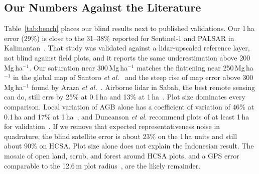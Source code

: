 \documentclass[conference,a4paper]{IEEEtran}
\begin{document}
\subsection{Our Numbers Against the Literature}
Table~\ref{tab:bench} places our blind results next to published validations. Our 1\,ha error (29\%) is close to the 31--38\% reported for Sentinel-1 and PALSAR in Kalimantan~\cite{berninger2018sar}. That study was validated against a lidar-upscaled reference layer, not blind against field plots, and it reports the same underestimation above 200\,Mg\,ha$^{-1}$. Our saturation near 300\,Mg\,ha$^{-1}$ matches the flattening near 250\,Mg\,ha$^{-1}$ in the global map of Santoro \textit{et al.}~\cite{santoro2021global} and the steep rise of map error above 300\,Mg\,ha$^{-1}$ found by Araza \textit{et al.}~\cite{araza2022comprehensive}. Airborne lidar in Sabah, the best remote sensing can do, still errs by 25\% at 0.1\,ha and 13\% at 1\,ha~\cite{jucker2018estimating}. Plot size dominates every comparison. Local variation of AGB alone has a coefficient of variation of 46\% at 0.1\,ha and 17\% at 1\,ha~\cite{rejou2014local}, and Duncanson \textit{et al.} recommend plots of at least 1\,ha for validation~\cite{duncanson2019importance}. If we remove that expected representativeness noise in quadrature, the blind satellite error is about 23\% on the 1\,ha units and still about 90\% on HCSA. Plot size alone does not explain the Indonesian result. The mosaic of open land, scrub, and forest around HCSA plots, and a GPS error comparable to the 12.6\,m plot radius~\cite{duncanson2019importance}, are the likely remainder.
\end{document}
